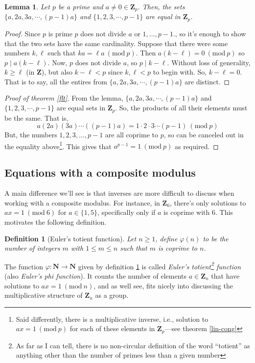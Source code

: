\documentclass[12pt]{article}
\numberwithin{equation}{subsection}
\newtheorem{lem}[subsection]{Lemma}
\newtheorem{defn}[subsection]{Definition}
\theoremstyle{note}
\newcommand{\Mod}[1]{\ (\mathrm{mod}\ #1)}
\begin{document}
\begin{lem} \label{flt-lem} Let $p$ be a prime and $a\neq 0\in\mathbf{Z}_p$. Then, the sets $\{a,2a,3a,\cdots,(p-1)a\}$ and $\{1,2,3,\cdots,p-1\}$ are equal in $\mathbf{Z}_p$.
\end{lem}
\begin{proof}
	Since $p$ is prime $p$ does not divide $a$ or $1,\dots,p-1$., so it's enough to show that the two sets have the same cardinality. Suppose that there were some numbers $k,\ell$ such that $ka=\ell a\Mod{p}$. Then $a(k-\ell)=0\Mod{p}$ so $p\mid a(k-\ell)$. Now, $p$ does not divide $a$, so $p\mid k-\ell$. Without loss of generality, $k\geq \ell$ (in $\mathbf{Z}$), but also $k-\ell < p$ since $k,\ell<p$ to begin with. So, $k-\ell=0$. That is to say, all the entires from $\{a,2a,3a,\cdots,(p-1)a\}$ are distinct. 
\end{proof}

\begin{proof}[Proof of theorem \ref{flt}]
From the lemma, $\{a,2a,3a,\cdots,(p-1)a\}$ and $\{1,2,3,\cdots,p-1\}$ are equal sets in $\mathbf{Z}_p$. So, the products of all their elements must be the same. That is, \[ a (2a) (3a) \cdots ((p-1)a)=1\cdot2 \cdot 3\cdots (p-1) \Mod{p}\] But, the numbers $1,2,3,\dots,p-1$ are all coprime to $p$, so can be canceled out in the equality above\footnote{Said differently, there is a multiplicative inverse, i.e., solution to $ax=1\Mod{p}$ for each of these elements in $\mathbf{Z}_p$---see theorem \ref{lin-cong}}. This gives that $a^{p-1}=1\Mod{p}$ as required. 
\end{proof}

\subsection{Equations with a composite modulus}

A main difference we'll see is that inverses are more difficult to discuss when working with a composite modulus. For instance, in $\mathbf{Z}_6$, there's only solutions to $ax=1\Mod{6}$ for $a\in\{1,5\}$, specifically only if $a$ is coprime with 6. This motivates the following definition. 

\begin{defn}[Euler's totient function] \label{totient}
	Let $n\geq 1$, define $\varphi(n)$ to be the number of integers $m$ with $1\leq m\leq n$ such that $m$ is coprime to $n$. 
\end{defn}

The function $\varphi\colon \mathbf{N}\to\mathbf{N}$ given by definition \ref{totient} is called \textit{Euler's totient\footnote{As far as I can tell, there is no non-circular definition of the word ``totient'' as anything other than the number of primes less than a given number} function} (also \textit{Euler's phi function}). It counts the number of elements $a\in \mathbf{Z}_n$ that have solutions to $ax=1\Mod{n}$, and as well see, fits nicely into discussing the multiplicative structure of $\mathbf{Z}_n$ as a group. 
\end{document}
